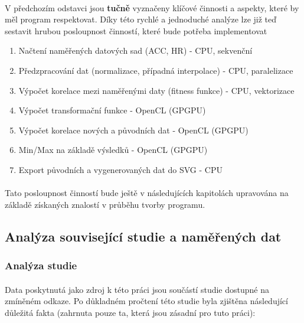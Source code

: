 \documentclass[12pt, a4paper]{article}
\begin{document}
\paragraph{} V předchozím odstavci jsou \textbf{tučně} vyznačeny klíčové činnosti a aspekty, které by měl program respektovat.
Díky této rychlé a jednoduché analýze lze již teď sestavit hrubou posloupnost činností, které bude potřeba implementovat

\begin{enumerate}
  \item Načtení naměřených datových sad (ACC, HR) - CPU, sekvenční
  \item Předzpracování dat (normalizace, případná interpolace) - CPU, paralelizace
  \item Výpočet korelace mezi naměřenými daty (fitness funkce) - CPU, vektorizace
  \item Výpočet transformační funkce - OpenCL (GPGPU)
  \item Výpočet korelace nových a původních dat - OpenCL (GPGPU)
  \item Min/Max na základě výsledků - OpenCL (GPGPU)
  \item Export původních a vygenerovaných dat do SVG - CPU
\end{enumerate}

\paragraph{} Tato posloupnost činností bude ještě v následujících kapitolách upravována na základě získaných znalostí v průběhu tvorby programu.

\subsection{Analýza související studie a naměřených dat}
\subsubsection{Analýza studie}
\paragraph{} Data poskytnutá jako zdroj k této práci jsou součástí studie dostupné na zmíněném odkaze.
Po důkladném pročtení této studie byla zjištěna následující důležitá fakta (zahrnuta pouze ta, která jsou zásadní pro tuto práci):
\end{document}
